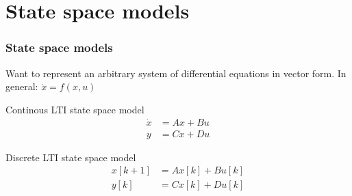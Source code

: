 \documentclass{beamer}
\begin{document}

\section{State space models}

\begin{frame}
    \frametitle{State space models}
    Want to represent an arbitrary system of differential equations in vector form. In general: $\dot{x} = f(x, u)$

    \begin{block}{Continous LTI state space model}
        \begin{equation}
        \begin{aligned}
            \dot{x} &= A x + B u \\
            y &=C x + D u
        \end{aligned}
        \end{equation}
    \end{block}

    \begin{block}{Discrete LTI state space model}
        \begin{equation}
        \begin{aligned}
            x[k+1] &= A x[k] + B u[k] \\
            y[k] &= C x[k] + D u[k]
        \end{aligned}
        \end{equation}
    \end{block}
\end{frame}

\end{document}

